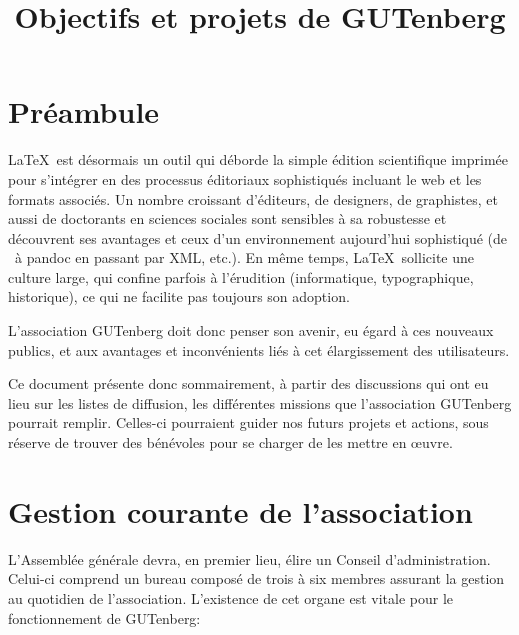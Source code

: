 \documentclass{tufte-handout}
\title{Objectifs et projets de GUTenberg}
\author{}
\date{}
\newcommand{\ratio}[3][]{\marginpar{\footnotesize{\textcolor{teal}{Temps requis: #2 / Utilité: #3}\par\noindent \textcolor{teal}{#1}}}}
\begin{document}
\maketitle


\section*{Préambule}

\LaTeX\ est désormais un outil  qui déborde la simple édition scientifique imprimée pour s'intégrer en des processus éditoriaux sophistiqués incluant  le web et les formats associés. Un nombre croissant d'éditeurs, de  designers, de graphistes, et aussi de doctorants en sciences sociales sont sensibles à sa robustesse et découvrent ses avantages et ceux d'un environnement aujourd'hui sophistiqué (de \LuaLaTeX\ à pandoc en passant par XML, etc.). En même temps, \LaTeX\ sollicite une culture large, qui confine parfois à l'érudition (informatique, typographique, historique), ce qui ne facilite pas toujours son adoption. 
	
L'association GUTenberg doit donc penser son avenir, eu égard à ces nouveaux publics, et aux avantages et inconvénients liés à cet élargissement des utilisateurs.
	
	
Ce document présente donc sommairement, à partir des discussions qui ont eu lieu sur les listes de diffusion, les différentes missions que l'association GUTenberg pourrait remplir. Celles-ci pourraient guider nos futurs projets et actions, sous réserve de trouver des bénévoles pour se charger de les mettre en œuvre.

\tableofcontents

\clearpage


\section{Gestion courante de l'association}

L'Assemblée générale\ratio[Investissement régulier et dans la durée, les mandats durant 4 ans]{+++}{+++} devra, en premier lieu, élire un Conseil d'administration. Celui-ci comprend un bureau composé de trois à six membres assurant la gestion au quotidien de l'association. L'existence de cet organe est vitale pour le fonctionnement de GUTenberg:
\end{document}
